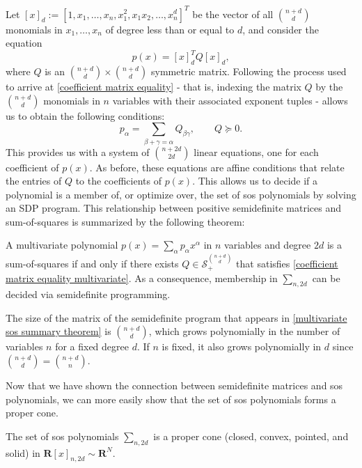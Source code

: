 	Let $[x]_d := [1, x_1, \dots, x_n, x_1^2, x_1 x_2, \dots, x_n^d]^T$ be the vector of all $\binom{n+d}{d}$ monomials in $x_1, \dots, x_n$ of degree less than or equal to $d$, and consider the equation 
	\begin{equation} \label{multivariate poly sos}
		p(x) = [x]_d^T Q [x]_d,
	\end{equation}
	where $Q$ is an $\binom{n+d}{d} \times \binom{n+d}{d}$ symmetric matrix. Following the process used to arrive at \eqref{coefficient matrix equality} - that is, indexing the matrix $Q$ by the $\binom{n+d}{d}$ monomials in $n$ variables with their associated exponent tuples - allows us to obtain the following conditions:
	\begin{equation} \label{coefficient matrix equality multivariate}
		p_{\alpha} = \sum_{\beta + \gamma = \alpha} Q_{\beta \gamma}, \qquad Q \succeq 0.
	\end{equation}
	This provides us with a system of $\binom{n+2d}{2d}$ linear equations, one for each coefficient of $p(x)$. As before, these equations are affine conditions that relate the entries of $Q$ to the coefficients of $p(x)$. This allows us to decide if a polynomial is a member of, or optimize over, the set of sos polynomials by solving an SDP program. This relationship between positive semidefinite matrices and sum-of-squares is summarized by the following theorem:
	\begin{theorem} \label{multivariate sos summary theorem}
		A multivariate polynomial $p(x) = \sum_{\alpha} p_{\alpha} x^{\alpha}$ in $n$ variables and degree $2d$  is a sum-of-squares if and only if there exists $Q \in \mathcal{S}_{+}^{\binom{n+d}{d}}$ that satisfies \eqref{coefficient matrix equality multivariate}. As a consequence, membership in $\sum_{n, 2d}$ can be decided via semidefinite programming. 
	\end{theorem}
	
	The size of the matrix of the semidefinite program that appears in \eqref{multivariate sos summary theorem} is $\binom{n+d}{d}$, which grows polynomially in the number of variables $n$ for a fixed degree $d$. If $n$ is fixed, it also grows polynomially in $d$ since $\binom{n+d}{d} = \binom{n+d}{n}$. 
	
	Now that we have shown the connection between semidefinite matrices and sos polynomials, we can more easily show that the set of sos polynomials forms a proper cone.
	
	\begin{theorem}
		The set of sos polynomials $\sum_{n, 2d}$ is a proper cone (closed, convex, pointed, and solid) in $\mathbf{R}[x]_{n, 2d} \sim \mathbf{R}^N$.
	\end{theorem}
	
